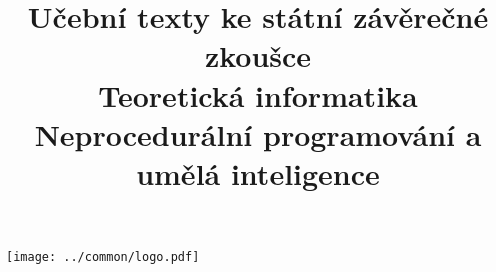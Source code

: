 \clearpage

\clearpage

\title{\LARGE Učební texty ke státní závěrečné zkoušce \\ Teoretická informatika \\ Neprocedurální programování a umělá inteligence}




\maketitle

\vspace{10mm}
\begin{center}
\texttt{[image: ../common/logo.pdf]}
\end{center} 

\clearpage

\clearpage

\tableofcontents








